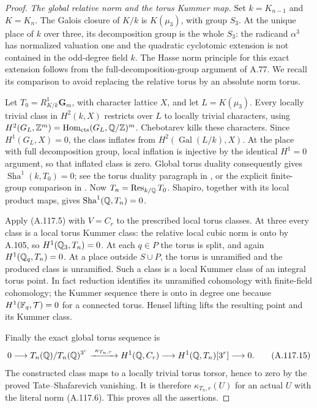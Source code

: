 \begin{proof}
\emph{The global relative norm and the torus Kummer map.}
Set \(k=K_{n-1}\) and \(K=K_n\).
The Galois closure of \(K/k\) is \(K(\mu_3)\),
with group \(S_3\).
At the unique place of \(k\) over three, its
decomposition group is the whole \(S_3\): the
radicand \(\alpha^3\) has normalized valuation
one and the quadratic cyclotomic extension
is not contained in the odd-degree field \(k\).
The Hasse norm principle for this exact extension
follows from the full-decomposition-group argument
of A.77.  We recall its comparison to avoid replacing
the relative torus by an absolute norm torus.

Let \(T_0=R^1_{K/k}\mathbf G_m\), with character
lattice \(X\), and let \(L=K(\mu_3)\).
Every locally trivial class in \(H^2(k,X)\)
restricts over \(L\) to locally trivial characters,
using
\(H^2(G_L,\mathbb Z^m)=\operatorname{Hom}_{\rm cts}
 (G_L,\mathbb Q/\mathbb Z)^m\).
Chebotarev kills these characters.
Since \(H^1(G_L,X)=0\), the class inflates from
\(H^2(\operatorname{Gal}(L/k),X)\).
At the place with full decomposition group, local
inflation is injective by the identical \(H^1=0\)
argument, so that inflated class is zero.
Global torus duality consequently gives
\(\operatorname{Sha}^1(k,T_0)=0\);
see the torus duality paragraph in
\cite[I, \S4, p.~66]{BIR_MilneADT}, or the explicit
finite-group comparison in
\cite[Proposition 6.4 and Corollary 6.5]{BIR_Oki2026Norm}.
Now \(T_n=\operatorname{Res}_{k/\mathbb Q}T_0\).
Shapiro, together with its local product maps,
gives \(\operatorname{Sha}^1(\mathbb Q,T_n)=0\).

Apply (A.117.5) with \(V=C_r\) to the prescribed
local torus classes.  At three every class is
a local torus Kummer class: the relative local
cubic norm is onto by A.105, so
\(H^1(\mathbb Q_3,T_n)=0\).
At each \(q\in P\) the torus is split, and again
\(H^1(\mathbb Q_q,T_n)=0\).
At a place outside \(S\cup P\), the torus is
unramified and the produced class is unramified.
Such a class is a local Kummer class of an integral
torus point.  In fact reduction identifies its
unramified cohomology with finite-field cohomology;
the Kummer sequence there is onto in degree one
because \(H^1(\mathbb F_q,\mathcal T)=0\) for a connected
torus.  Hensel lifting lifts the resulting point
and its Kummer class.

Finally the exact global torus sequence is
\[
 0\longrightarrow T_n(\mathbb Q)/T_n(\mathbb Q)^{3^r}
 \xrightarrow{\ \kappa_{T_n,r}\ } H^1(\mathbb Q,C_r)
 \longrightarrow H^1(\mathbb Q,T_n)[3^r]\longrightarrow0.
 \tag{A.117.15}
\]
The constructed class maps to a locally trivial
torus torsor, hence to zero by the proved
Tate--Shafarevich vanishing.
It is therefore \(\kappa_{T_n,r}(U)\) for an
actual \(U\) with the literal norm (A.117.6).
This proves all the assertions.
\end{proof}

